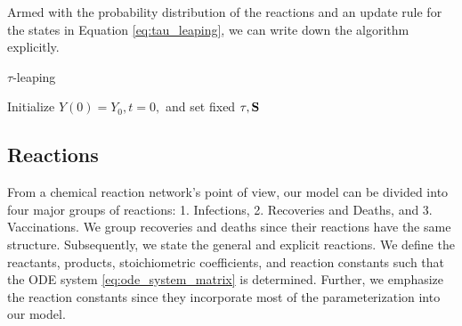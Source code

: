 Armed with the probability distribution of the reactions and an update rule for the states in Equation \eqref{eq:tau_leaping}, we can write down the algorithm explicitly. 

\begin{algorithm}[H]
 \caption{$\tau$-leaping}
 \label{Algo:stochastic}
\SetAlgoLined
{}
 Initialize $Y(0) = Y_0, t=0,$ and set fixed $\tau, \mathbf{S}$\;

\end{algorithm}


\subsection{Reactions}
From a chemical reaction network's point of view, our model can be divided into four major groups of reactions: 1. Infections, 2. Recoveries and Deaths, and 3. Vaccinations. We group recoveries and deaths since their reactions have the same structure. Subsequently, we state the general and explicit reactions. We define the reactants, products, stoichiometric coefficients, and reaction constants such that the ODE system \eqref{eq:ode_system_matrix} is determined. Further, we emphasize the reaction constants since they incorporate most of the parameterization into our model.


